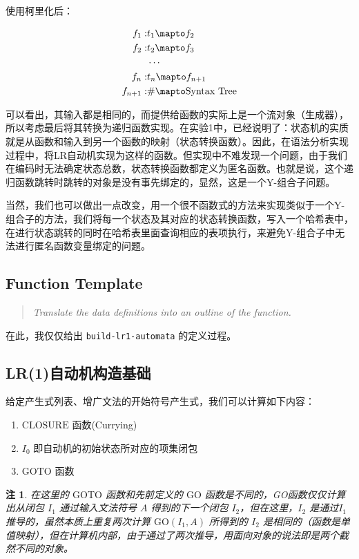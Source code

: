 \documentclass[lang=cn]{ctexart}
\newtheorem{remark}{注}
\begin{document}
{使用柯里化后：

$$
\begin{aligned}
	f_1:&t_1\mapto f_2\\
	f_2:&t_2\mapto f_3\\
	&\cdots\\
	f_n:&t_n \mapto f_{n+1}\\
	f_{n+1}:&\# \mapto \mathrm{Syntax~Tree}
\end{aligned}
$$

可以看出，其输入都是相同的，而提供给函数的实际上是一个流对象（生成器），所以考虑最后将其转换为递归函数实现。在实验1中，已经说明了：状态机的实质就是从函数和输入到另一个函数的映射（状态转换函数）。因此，在语法分析实现过程中，将LR自动机实现为这样的函数。但实现中不难发现一个问题，由于我们在编码时无法确定状态总数，状态转换函数都定义为匿名函数。也就是说，这个递归函数跳转时跳转的对象是没有事先绑定的，显然，这是一个Y-组合子问题。

当然，我们也可以做出一点改变，用一个很不函数式的方法来实现类似于一个Y-组合子的方法，我们将每一个状态及其对应的状态转换函数，写入一个哈希表中，在进行状态跳转的同时在哈希表里面查询相应的表项执行，来避免Y-组合子中无法进行匿名函数变量绑定的问题。

\subsection{Function Template}
\begin{quotation}
	\textit{Translate the data definitions into an outline of the function.}
\end{quotation}

在此，我仅仅给出 \lstinline|build-lr1-automata| 的定义过程。

\subsection{LR(1)自动机构造基础}

给定产生式列表、增广文法的开始符号产生式，我们可以计算如下内容：

\begin{enumerate}
	\item $\mathrm{CLOSURE}$ 函数(Currying)
	\item $I_0$ 即自动机的初始状态所对应的项集闭包
	\item $\mathrm{GOTO}$ 函数
\end{enumerate}

\begin{remark}
	在这里的 $\mathrm{GOTO}$ 函数和先前定义的 $\mathrm{GO}$ 函数是不同的，GO函数仅仅计算出从闭包 $I_1$ 通过输入文法符号 $A$ 得到的下一个闭包 $I_2$，但在这里，$I_2$ 是通过$I_1$推导的，虽然本质上重复两次计算 $\mathrm{GO}(I_1, A)$ 所得到的 $I_2$ 是相同的（函数是单值映射），但在计算机内部，由于通过了两次推导，用面向对象的说法即是两个截然不同的对象。
\end{remark}

}
\end{document}
